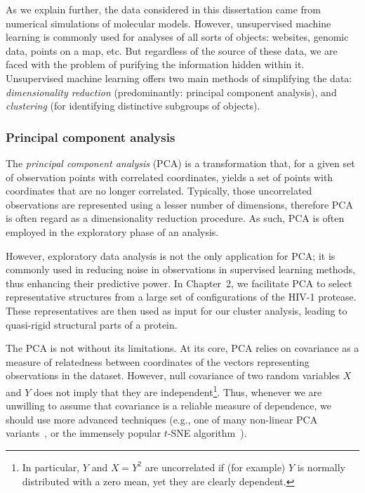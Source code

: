 \documentclass[a4paper,11pt,twoside]{book}%
\begin{document}
As we explain further, the data considered in this dissertation came from numerical simulations of molecular models.
However, unsupervised machine learning is commonly used for analyses of all sorts of objects: websites, genomic data, points on a map, etc. 
But regardless of the source of these data, we are faced with the problem of purifying the information hidden within it.
Unsupervised machine learning offers two main methods of simplifying the data: \emph{dimensionality reduction} (predominantly: principal component analysis), and \emph{clustering} (for identifying distinctive subgroups of objects).

\subsubsection{Principal component analysis}

The \emph{principal component analysis} (PCA) is a transformation that, for a given set of observation points with correlated coordinates, yields a set of points with coordinates that are no longer correlated.
Typically, those uncorrelated observations are represented using a lesser number of dimensions, therefore PCA is often regard as a dimensionality reduction procedure.
As such, PCA is often employed in the exploratory phase of an analysis.

However, exploratory data analysis is not the only application for PCA; it is commonly used in reducing noise in observations in supervised learning methods, thus enhancing their predictive power.
In Chapter~2, we facilitate PCA to select representative structures from a large set of configurations of the HIV-1 protease.
These representatives are then used as input for our cluster analysis, leading to quasi-rigid structural parts of a protein.

The PCA is not without its limitations.
At its core, PCA relies on covariance as a measure of relatedness between coordinates of the vectors representing observations in the dataset.
However, null covariance of two random variables $X$ and $Y$ does not imply that they are independent\footnote{
In particular, $Y$ and $X = Y^2$ are uncorrelated if (for example) $Y$ is normally distributed with a zero mean, yet they are clearly dependent.
}.
Thus, whenever we are unwilling to assume that covariance is a reliable measure of dependence, we should use more advanced techniques (e.g., one of many non-linear PCA variants~\cite{gorban2008principal}, or the immensely popular $t$-SNE algorithm~\cite{maaten2008visualizing}).
\end{document}

